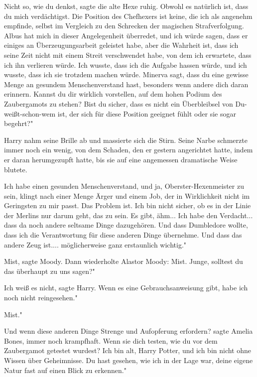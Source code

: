 \glqq{}Nicht so, wie du denkst\grqq{}, sagte die alte Hexe ruhig. \glqq{}Obwohl es
natürlich ist, dass du mich verdächtigst. Die Position des Chefhexers ist keine,
die ich als angenehm empfinde, selbst im Vergleich zu den Schrecken der
magischen Strafverfolgung. Albus hat mich in dieser Angelegenheit überredet, und
ich würde sagen, dass er einiges an Überzeugungsarbeit geleistet habe, aber die
Wahrheit ist, dass ich seine Zeit nicht mit einem Streit verschwendet habe, von
dem ich erwartete, dass ich ihn verlieren würde. Ich wusste, dass ich die
Aufgabe hassen würde, und ich wusste, dass ich sie trotzdem machen würde.
Minerva sagt, dass du eine gewisse Menge an gesundem Menschenverstand hast,
besonders wenn andere dich daran erinnern. Kannst du dir wirklich vorstellen,
auf dem hohen Podium des Zaubergamots zu stehen? Bist du sicher, dass es nicht
ein Überbleibsel von Du-weißt-schon-wem ist, der sich für diese Position
geeignet fühlt oder sie sogar begehrt?"

Harry nahm seine Brille ab und massierte sich die Stirn. Seine Narbe schmerzte
immer noch ein wenig, von dem Schaden, den er gestern angerichtet hatte, indem
er daran herumgezupft hatte, bis sie auf eine angemessen dramatische Weise
blutete.

\glqq{}Ich habe einen gesunden Menschenverstand, und ja, Oberster-Hexenmeister zu
sein, klingt nach einer Menge Ärger und einem Job, der in Wirklichkeit nicht im
Geringsten zu mir passt. Das Problem ist. Ich bin nicht sicher, ob es in der
Linie der Merlins nur darum geht, das zu sein. Es gibt, ähm... Ich habe den
Verdacht... dass da noch andere seltsame Dinge dazugehören. Und dass Dumbledore
wollte, dass ich die Verantwortung für diese anderen Dinge übernehme. Und dass
das andere Zeug ist.... möglicherweise ganz erstaunlich wichtig."

\glqq{}Mist\grqq{}, sagte Moody. Dann wiederholte Alastor Moody: \glqq{}Mist.
Junge, solltest du das überhaupt zu uns sagen?"

\glqq{}Ich weiß es nicht\grqq{}, sagte Harry. \glqq{}Wenn es eine
Gebrauchsanweisung gibt, habe ich noch nicht reingesehen."

\glqq{}Mist."

\glqq{}Und wenn diese anderen Dinge Strenge und Aufopferung erfordern?\grqq{}
sagte Amelia Bones, immer noch krampfhaft. \glqq{}Wenn sie dich testen, wie du
vor dem Zaubergamot getestet wurdest? Ich bin alt, Harry Potter, und ich bin
nicht ohne Wissen über Geheimnisse. Du hast gesehen, wie ich in der Lage war,
deine eigene Natur fast auf einen Blick zu erkennen."

